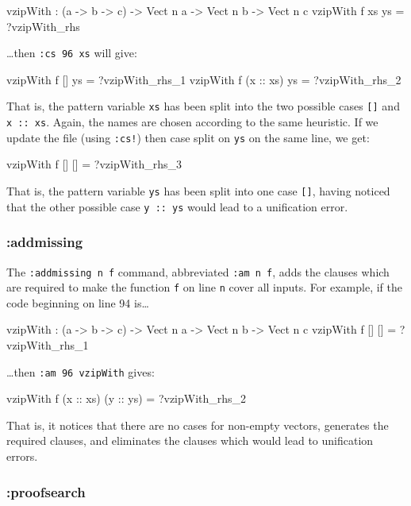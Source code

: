 \begin{code}
vzipWith : (a -> b -> c) -> 
           Vect n a -> Vect n b -> Vect n c
vzipWith f xs ys = ?vzipWith_rhs
\end{code}

\ldots then \texttt{:cs 96 xs} will give:

\begin{code}
vzipWith f [] ys = ?vzipWith_rhs_1
vzipWith f (x :: xs) ys = ?vzipWith_rhs_2
\end{code}

\noindent That is, the pattern variable \texttt{xs} has been split into the
two possible cases \texttt{[]} and \texttt{x :: xs}. Again, the names are
chosen according to the same heuristic. 
%
If we update the file (using \texttt{:cs!}) then case split on \texttt{ys}
on the same line, we get:

\begin{code}
vzipWith f [] [] = ?vzipWith_rhs_3
\end{code}

\noindent That is, the pattern variable \texttt{ys} has been split into
one case \texttt{[]}, \Idris{} having noticed that the other possible case
\texttt{y :: ys} would lead to a unification error.

\subsubsection{:addmissing}

The \texttt{:addmissing n f} command, abbreviated \texttt{:am n f}, adds
the clauses which are required to make the function \texttt{f} on line
\texttt{n} cover all inputs. 
For example, if the code beginning on line 94 is\ldots

\begin{code}
vzipWith : (a -> b -> c) -> 
           Vect n a -> Vect n b -> Vect n c
vzipWith f [] [] = ?vzipWith_rhs_1
\end{code}

\ldots then \texttt{:am 96 vzipWith} gives:

\begin{code}
vzipWith f (x :: xs) (y :: ys) = ?vzipWith_rhs_2
\end{code}

\noindent
That is, it notices that there are no cases for non-empty vectors, generates
the required clauses, and eliminates the clauses which would lead to
unification errors.

\subsubsection{:proofsearch}

